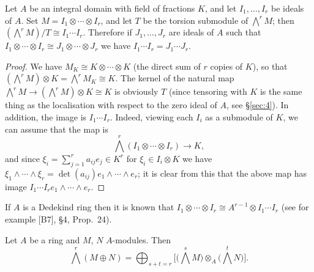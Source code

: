 \begin{theorem}\label{thm:C1}
Let $A$ be an integral domain with field of fractions $K$, and let
$I_1, \ldots, I_r$ be ideals of $A$. Set $M = I_1 \otimes \cdots \otimes I_r$, and let $T$ be the torsion
submodule of $\bigwedge^r M$; then $(\bigwedge^r M)/T \cong I_1 \cdots I_r$. Therefore if
$J_1, \ldots, J_r$ are ideals of $A$ such that $I_1 \otimes \cdots \otimes I_r \cong J_1 \otimes \cdots \otimes J_r$
we have $I_1 \cdots I_r = J_1 \cdots J_r$.
\end{theorem}

\begin{proof}
We have $M_K \cong K \otimes \cdots \otimes K$ (the direct sum of $r$ copies of $K$), so that
$(\bigwedge^r M) \otimes K = \bigwedge^r M_K \cong K$. The kernel of the natural map
$\bigwedge^r M \to (\bigwedge^r M) \otimes K \cong K$ is obviously $T$ (since tensoring with $K$ is
the same thing as the localisation with respect to the zero ideal of $A$, see
\S\ref{sec:4}). In addition, the image is $I_1 \cdots I_r$. Indeed, viewing each $I_i$ as a
submodule of $K$, we can assume that the map is
\[
  \bigwedge^r (I_1 \otimes \cdots \otimes I_r) \to K,
\]
and since $\xi_i = \sum_{j=1}^{r} a_{ij}e_j \in K^r$ for $\xi_i \in I_i \otimes K$ we have
$\xi_1 \wedge \cdots \wedge \xi_r = \det(a_{ij})e_1 \wedge \cdots \wedge e_r$; it is clear from this that the above
map has image $I_1 \cdots I_r e_1 \wedge \cdots \wedge e_r$.
\end{proof}

If $A$ is a Dedekind ring then it is known that $I_1 \otimes \cdots \otimes I_r \cong A^{r-1} \otimes
I_1 \cdots I_r$ (see for example [B7], \S4, Prop.~24).

\begin{theorem}\label{thm:C2}
Let $A$ be a ring and $M$, $N$ $A$-modules. Then
\[
  \bigwedge^r (M \oplus N) = \bigoplus_{s + t = r} \Big[\Big(\bigwedge^s M\Big) \otimes_A
      \Big(\bigwedge^t N\Big)\Big].
\]
\end{theorem}

